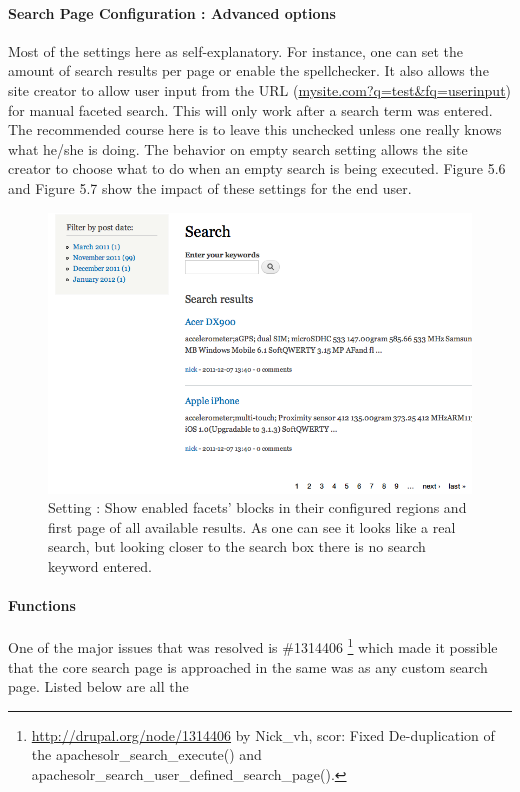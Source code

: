 \paragraph{Search Page Configuration : Advanced options}
Most of the settings here as self-explanatory. For instance, one can set the amount of search results per page or enable the spellchecker. It also allows the site creator to allow user input from the URL (\url{mysite.com?q=test&fq=userinput}) for manual faceted search. This will only work after a search term was entered. The recommended course here is to leave this unchecked unless one really knows what he/she is doing. The behavior on empty search setting allows the site creator to choose what to do when an empty search is being executed. Figure 5.6 and Figure 5.7 show the impact of these settings for the end user. 

\begin{figure}
     \includegraphics[width=\textwidth]{images/implementation/search_first_page_with_blocks_in_region.png}
     \caption{Setting : Show enabled facets' blocks in their configured regions and first page of all available results. As one can see it looks like a real search, but looking closer to the search box there is no search keyword entered.}
\end{figure}

\paragraph{Functions}
One of the major issues that was resolved is \#1314406 \footnote{\url{http://drupal.org/node/1314406} by Nick\_vh, scor: Fixed De-duplication of the apachesolr\_search\_execute() and apachesolr\_search\_user\_defined\_search\_page().} which made it possible that the core search page is approached in the same was as any custom search page. Listed below are all the 

